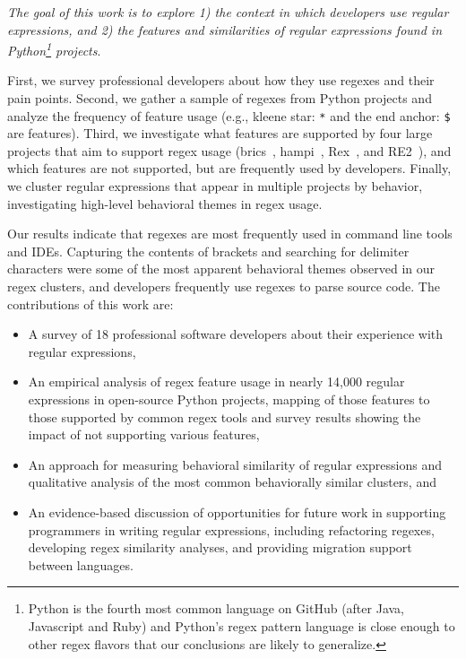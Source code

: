 \emph{The goal of this work is to explore 1) the context in which developers use regular expressions, and 2) the features and similarities of  regular expressions found in Python\footnote{Python is the fourth most common language on GitHub (after Java, Javascript and Ruby) and  Python's regex pattern language is close enough to other regex flavors that our conclusions are likely to generalize.} projects}.

First, we survey professional developers about how they use regexes and their pain points.  Second, we gather a sample of regexes from Python projects and analyze the frequency of feature usage (e.g., kleene star: \verb!*! and the end anchor: \verb!$! are features).    Third, we investigate what features are supported by four large projects that aim to support regex usage (brics~\cite{brics}, hampi~\cite{hampi}, Rex~\cite{rex}, and RE2~\cite{re2}), and which features are not supported, but are frequently used by developers.  Finally, we cluster regular expressions that appear in multiple projects by behavior, investigating high-level behavioral themes in regex usage.

Our results indicate that regexes are most frequently used in command line tools and IDEs.    Capturing the contents of brackets and searching for delimiter characters were some of the most apparent  behavioral themes observed in our regex clusters, and developers frequently use regexes to parse source code.
The contributions of this work are:
\begin{itemize} \setlength \itemsep{.1pt}
    \item A survey of 18 professional software developers about their experience with regular expressions,
	\item An empirical analysis of regex feature usage in nearly 14,000 regular expressions in  open-source Python projects, mapping of those features to those supported by common regex tools and survey results showing the impact of not supporting various features,
	\item An approach for measuring behavioral similarity of regular expressions and qualitative analysis of the most common behaviorally similar clusters, and
	\item An evidence-based discussion of opportunities for future work in supporting programmers in writing regular expressions, including refactoring regexes, developing regex similarity analyses, and providing migration support between languages.
\end{itemize}

